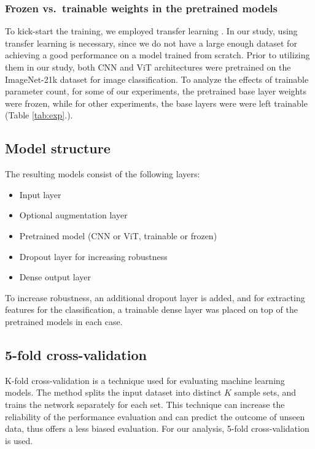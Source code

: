 \documentclass{article}
\begin{document}
\subsubsection{Frozen vs.~trainable weights in the pretrained models}
To kick-start the training, we employed transfer learning \citep{Vilalta2011}. In our study, using transfer learning is necessary, since we do not have a large enough dataset for achieving a good performance on a model trained from scratch.
Prior to utilizing them in our study, both CNN and ViT architectures were pretrained on the ImageNet-21k dataset \citep{Deng2009} for image classification. To analyze the effects of trainable parameter count, for some of our experiments, the pretrained base layer weights were frozen, while for other experiments, the base layers were were left trainable (Table \ref{tab:exp}.).

\subsection{Model structure}
The resulting models consist of the following layers:

\begin{itemize}\setlength{\itemsep}{0.2ex}
\item    Input layer
\item    Optional augmentation layer
\item    Pretrained model (CNN or ViT, trainable or frozen)
\item    Dropout layer for increasing robustness
\item    Dense output layer
\end{itemize}

To increase robustness, an additional dropout layer is added, and for extracting features for the classification, a trainable dense layer was placed on top of the pretrained models in each case.
    
\subsection{5-fold cross-validation}
K-fold cross-validation is a technique used for evaluating machine learning models. The method splits the input dataset into distinct $K$ sample sets, and trains the network separately for each set. This technique can increase the reliability of the performance evaluation and can predict the outcome of unseen data, thus offers a less biased evaluation. For our analysis, 5-fold cross-validation is used.
\end{document}
